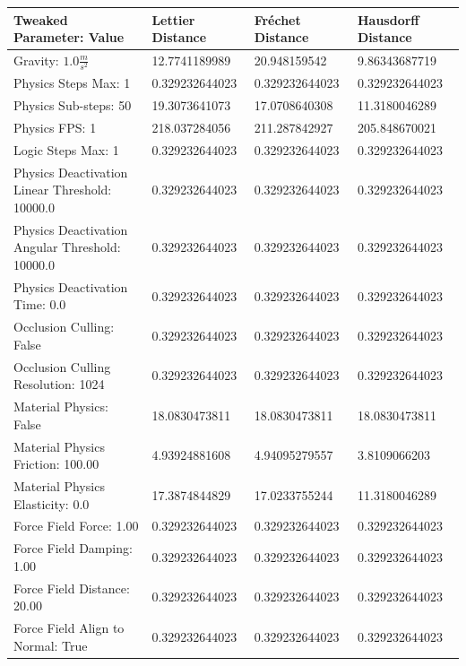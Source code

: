 \begin{table}[htbp]
\centering
\footnotesize
\def\arraystretch{1.1}
\begin{tabular}{ | l || l | l | l | }
\hline
\rowcolor{gray}
Tweaked Parameter: Value & Lettier Distance & Fréchet Distance & Hausdorff Distance \\ \hline
Gravity: $1.0\frac{m}{s^2}$ & 12.7741189989 & 20.948159542 & 9.86343687719 \\ \hline
\rowcolor{cyan}
Physics Steps Max: 1 & 0.329232644023 & 0.329232644023 & 0.329232644023 \\ \hline
Physics Sub-steps: 50 & 19.3073641073 & 17.0708640308 & 11.3180046289 \\ \hline
Physics FPS: 1 & 218.037284056 & 211.287842927 & 205.848670021 \\ \hline
\rowcolor{cyan}
Logic Steps Max: 1 & 0.329232644023 & 0.329232644023 & 0.329232644023 \\ \hline
\rowcolor{cyan}
Physics Deactivation Linear Threshold: 10000.0 & 0.329232644023 & 0.329232644023 & 0.329232644023 \\ \hline
\rowcolor{cyan}
Physics Deactivation Angular Threshold: 10000.0 & 0.329232644023 & 0.329232644023 & 0.329232644023 \\ \hline
\rowcolor{cyan}
Physics Deactivation Time: 0.0 & 0.329232644023 & 0.329232644023 & 0.329232644023 \\ \hline
\rowcolor{cyan}
Occlusion Culling: False & 0.329232644023 & 0.329232644023 & 0.329232644023 \\ \hline
\rowcolor{cyan}
Occlusion Culling Resolution: 1024 & 0.329232644023  & 0.329232644023  & 0.329232644023 \\ \hline
Material Physics: False & 18.0830473811 & 18.0830473811  & 18.0830473811 \\ \hline
Material Physics Friction: 100.00 & 4.93924881608  & 4.94095279557  & 3.8109066203 \\ \hline
Material Physics Elasticity: 0.0 & 17.3874844829  & 17.0233755244  & 11.3180046289 \\ \hline
\rowcolor{cyan}
Force Field Force: 1.00 & 0.329232644023  & 0.329232644023  & 0.329232644023 \\ \hline
\rowcolor{cyan}
Force Field Damping: 1.00 & 0.329232644023  & 0.329232644023  & 0.329232644023 \\ \hline
\rowcolor{cyan}
Force Field Distance: 20.00 & 0.329232644023  & 0.329232644023  & 0.329232644023 \\ \hline
\rowcolor{cyan}
Force Field Align to Normal: True & 0.329232644023  & 0.329232644023  & 0.329232644023 \\ \hline

\end{tabular}
\end{table}
